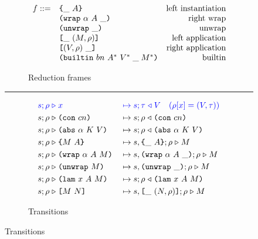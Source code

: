 \begin{figure}[!ht]
\begin{subfigure}[c]{\linewidth}  %
{\small
\caption{Reduction frames}
\[
    \begin{array}{rlr}
       f ::= & \texttt{\{}\_ ~ A\texttt{\}}                     & \textrm{left instantiation}\\
             & \texttt{(} \texttt{wrap} ~ \alpha ~ A ~ \_ \texttt{)}            & \textrm{right wrap}\\
             & \texttt{(} \texttt{unwrap} ~ \_ \texttt{)}{}                        & \textrm{unwrap}\\
             & \texttt{[} \_ ~ (M,\rho) \texttt{]}                 & \textrm{left application}\\
             & \texttt{[} (V,\rho) ~ \_ \texttt{]}                & \textrm{right application}\\
             & \texttt{(} \texttt{builtin} ~ bn ~ A^* ~ V^*\; \_\; M^* \texttt{)}        & \textrm{builtin}\\
    \end{array}
\]
}
\end{subfigure}
\vspace{1mm}
\hrule
\vspace{2mm}
\begin{subfigure}[c]{\linewidth}  %
{
\small
\caption{Transitions}
    \begin{alignat*}{2}
     \blue{s; \rho} &\bcompute \blue{x}          &{}\bmapsto{}&\blue{s;\tau \return V \quad (\rho[x] = (V,\tau))}\\  %
      s; \rho &\compute \con{cn}                 &{}\mapsto{}& s;\rho \return \con{cn}\\
      s; \rho &\compute \abs{\alpha}{K}{V}       &{}\mapsto{}& s;\rho \return \abs{\alpha}{K}{V}\\
      s; \rho &\compute \inst{M}{A}              &{}\mapsto{}& s,\inInstLeftFrame{A};\rho \compute M\\
      s; \rho &\compute \wrap{\alpha}{A}{M}      &{}\mapsto{}& s,\inWrapRightFrame{\alpha}{A};\rho  \compute M\\ 
      s; \rho &\compute \unwrap{M}               &{}\mapsto{}& s,\inUnwrapFrame{};\rho  \compute M\\
      s; \rho &\compute \lam{x}{A}{M}            &{}\mapsto{}& s;\rho \return \lam{x}{A}{M}\\
      s; \rho &\compute \app{M}{N}               &{}\mapsto{}& s,\inAppLeftFrame{(N,\rho)};\rho \compute M\\

\end{alignat*}}
\end{subfigure}
\end{figure}
